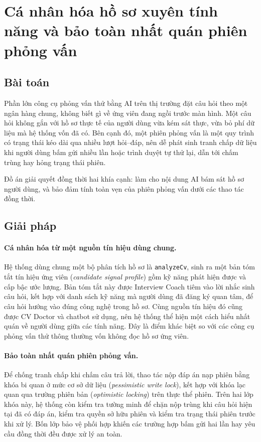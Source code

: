 \documentclass[../DoAn.tex]{subfiles}
\begin{document}
\section{Cá nhân hóa hồ sơ xuyên tính năng và bảo toàn nhất quán phiên phỏng vấn}
\label{sec:ch5-personalization}

\subsection{Bài toán}

Phần lớn công cụ phỏng vấn thử bằng AI trên thị trường đặt câu hỏi theo một ngân hàng chung, không biết gì về ứng viên đang ngồi trước màn hình. Một câu hỏi không gắn với hồ sơ thực tế của người dùng vừa kém sát thực, vừa bỏ phí dữ liệu mà hệ thống vốn đã có. Bên cạnh đó, một phiên phỏng vấn là một quy trình có trạng thái kéo dài qua nhiều lượt hỏi--đáp, nên dễ phát sinh tranh chấp dữ liệu khi người dùng bấm gửi nhiều lần hoặc trình duyệt tự thử lại, dẫn tới chấm trùng hay hỏng trạng thái phiên.

Đồ án giải quyết đồng thời hai khía cạnh: làm cho nội dung AI bám sát hồ sơ người dùng, và bảo đảm tính toàn vẹn của phiên phỏng vấn dưới các thao tác đồng thời.

\subsection{Giải pháp}

\paragraph{Cá nhân hóa từ một nguồn tín hiệu dùng chung.} Hệ thống dùng chung một bộ phân tích hồ sơ là \texttt{analyzeCv}, sinh ra một bản tóm tắt tín hiệu ứng viên (\textit{candidate signal profile}) gồm kỹ năng phát hiện được và cấp bậc ước lượng. Bản tóm tắt này được Interview Coach tiêm vào lời nhắc sinh câu hỏi, kết hợp với danh sách kỹ năng mà người dùng đã đăng ký quan tâm, để câu hỏi hướng vào đúng công nghệ trong hồ sơ. Cùng nguồn tín hiệu đó cũng được CV Doctor và chatbot sử dụng, nên hệ thống thể hiện một cách hiểu nhất quán về người dùng giữa các tính năng. Đây là điểm khác biệt so với các công cụ phỏng vấn thử thông thường vốn không đọc hồ sơ ứng viên.

\paragraph{Bảo toàn nhất quán phiên phỏng vấn.} Để chống tranh chấp khi chấm câu trả lời, thao tác nộp đáp án nạp phiên bằng khóa bi quan ở mức cơ sở dữ liệu (\textit{pessimistic write lock}), kết hợp với khóa lạc quan qua trường phiên bản (\textit{optimistic locking}) trên thực thể phiên. Trên hai lớp khóa này, hệ thống còn kiểm tra tường minh để chặn nộp trùng khi câu hỏi hiện tại đã có đáp án, kiểm tra quyền sở hữu phiên và kiểm tra trạng thái phiên trước khi xử lý. Bốn lớp bảo vệ phối hợp khiến các trường hợp bấm gửi hai lần hay yêu cầu đồng thời đều được xử lý an toàn.
\end{document}
